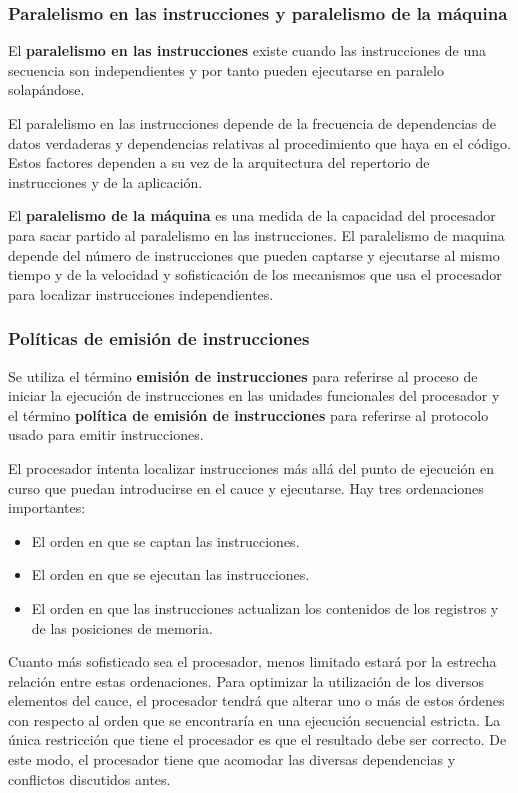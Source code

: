 \subsubsection*{Paralelismo en las instrucciones y paralelismo de la máquina}

El \textbf{paralelismo en las instrucciones} existe cuando las instrucciones de una secuencia son independientes y por tanto pueden ejecutarse en paralelo solapándose.

El paralelismo en las instrucciones depende de la frecuencia de dependencias de datos verdaderas y dependencias relativas al procedimiento que haya en el código. Estos factores dependen a su vez de la arquitectura del repertorio de instrucciones y de la aplicación.

El \textbf{paralelismo de la máquina} es una medida de la capacidad del procesador para sacar partido al paralelismo en las instrucciones. El paralelismo de maquina depende del número de instrucciones que pueden captarse y ejecutarse al mismo tiempo y de la velocidad y sofisticación de los mecanismos que usa el procesador para localizar instrucciones independientes.

\subsubsection*{Políticas de emisión de instrucciones}

Se utiliza el término \textbf{emisión de instrucciones} para referirse al proceso de iniciar la ejecución de instrucciones en las unidades funcionales del procesador y el término \textbf{política de emisión de instrucciones} para referirse al protocolo usado para emitir instrucciones.

El procesador intenta localizar instrucciones más allá del punto de ejecución en curso que puedan introducirse en el cauce y ejecutarse. Hay tres ordenaciones importantes:

\begin{itemize}
  \item El orden en que se captan las instrucciones.
  \item El orden en que se ejecutan las instrucciones.
  \item El orden en que las instrucciones actualizan los contenidos de los registros y de las posiciones de memoria.
\end{itemize}

Cuanto más sofisticado sea el procesador, menos limitado estará por la estrecha relación entre estas ordenaciones. Para optimizar la utilización de los diversos elementos del cauce, el procesador tendrá que alterar uno o más de estos órdenes con respecto al orden que se encontraría en una ejecución secuencial estricta. La única restricción que tiene el procesador es que el resultado debe ser correcto. De este modo, el procesador tiene que acomodar las diversas dependencias y conflictos discutidos antes.

